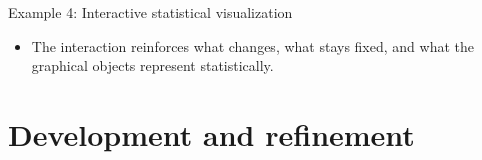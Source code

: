 \documentclass[aspectratio=169,10pt]{beamer}
\begin{document}
\begin{frame}{Example 4: Interactive statistical visualization}
\vspace{0.2em}
\vspace{-0.45em}
\begin{itemize}
  \item The interaction reinforces what changes, what stays fixed, and what the graphical objects represent statistically.
\end{itemize}
\end{frame}

\section{Development and refinement}
\end{document}
